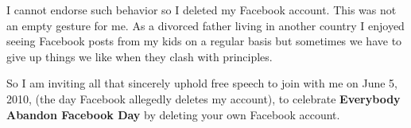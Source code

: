 I cannot endorse such behavior so I deleted my Facebook account. This
was not an empty gesture for me. As a divorced father living in another
country I enjoyed seeing Facebook posts from my kids on a regular basis
but sometimes we have to give up things we like when they clash with
principles.

So I am inviting all that sincerely uphold free speech to join with me
on June 5, 2010, (the day Facebook allegedly deletes my account), to
celebrate \textbf{Everybody Abandon Facebook Day} by deleting your own
Facebook account.




%